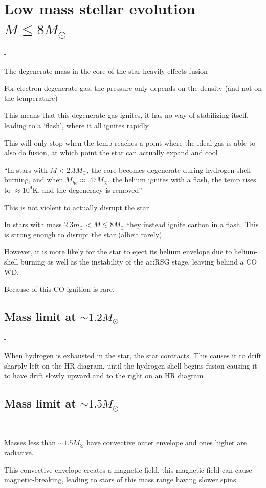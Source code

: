 \section{Low mass stellar evolution \(M\leq 8M_\odot\)}
\begin{list}{-}{}
\item The degenerate mass in the core of the star heavily effects fusion 
\item For electron degenerate gas, the pressure only depends on the density (and not on the temperature)
\item This means that this degenerate gas ignites, it has no way of stabilizing itself, leading to a `flash', where it all ignites rapidly. 
\item This will only stop when the temp reaches a point where the ideal gas is able to also do fusion, at which point the star can actually expand and cool
\item ``In stars with \(M < 2.3 M_\odot\), the core becomes degenerate during hydrogen shell burning, and when \(M_{he} \approx .47M_\odot\), the helium ignites with a flash, the temp rises to \(\approx10^9\)K, and the degeneracy is removed''
\item This is not violent to actually disrupt the star
\item In stars with mass \(2.3m_\odot < M \lesssim 8M_\odot\) they instead ignite carbon in a flash. This is strong enough to disrupt the star (albeit rarely)
\item However, it is more likely for the star to eject its helium envelope due to helium-shell burning as well as the instability of the \gls{ac:RSG} stage, leaving behind a CO WD.
\item Because of this CO ignition is rare. 
\end{list}

\subsection{Mass limit at \(\sim 1.2M_\odot\)}
\begin{list}{-}{}
\item When hydrogen is exhausted in the star, the star contracts. This causes it to drift sharply left on the HR diagram, until the hydrogen-shell begins fusion causing it to have drift slowly upward and to the right on an HR diagram
\item 
\end{list}

\subsection{Mass limit at \(\sim 1.5 M_\odot\)}
\begin{list}{-}{}
\item Masses less than \(\sim 1.5 M_\odot\) have convective outer envelope and ones higher are radiative. 
\item This convective envelope creates a magnetic field, this magnetic field can cause \gls{magnetic-breaking}, leading to stars of this mass range having slower spins
\end{list}

